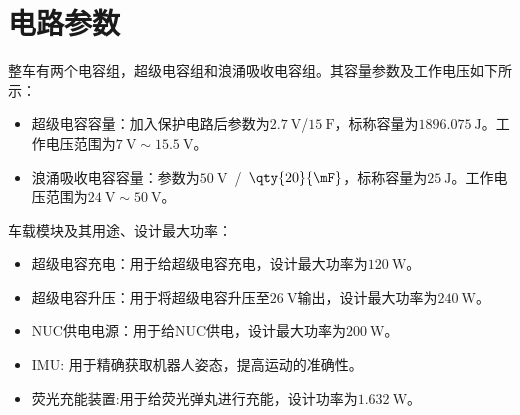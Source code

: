 \section{电路参数}
整车有两个电容组，超级电容组和浪涌吸收电容组。其容量参数及工作电压如下所示：
\begin{itemize}
    \item 超级电容容量：加入保护电路后参数为$\qty{2.7}{\V}$/$\qty{15}{\F}$，标称容量为$\qty{1896.075}{\J}$。工作电压范围为$\qty{7}{\V}\sim\qty{15.5}{\V}$。
    \item 浪涌吸收电容容量：参数为$\qty{50}{\V}$\ /\ $\qty{20}{\mF}$，标称容量为$\qty{25}{\J}$。工作电压范围为$\qty{24}{\V}\sim\qty{50}{\V}$。
\end{itemize}

车载模块及其用途、设计最大功率：
\begin{itemize}
    \item 超级电容充电：用于给超级电容充电，设计最大功率为$\qty{120}{\W}$。
    \item 超级电容升压：用于将超级电容升压至$\qty{26}{\V}$输出，设计最大功率为$\qty{240}{\W}$。
    \item NUC供电电源：用于给NUC供电，设计最大功率为$\qty{200}{\W}$。
    \item IMU: 用于精确获取机器人姿态，提高运动的准确性。
    \item 荧光充能装置:用于给荧光弹丸进行充能，设计功率为$\qty{1.632}{\W}$。
\end{itemize}